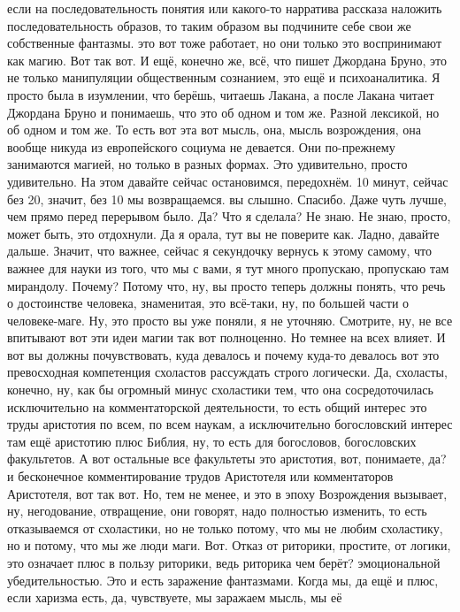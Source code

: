 если на последовательность понятия или какого-то нарратива рассказа наложить
последовательность образов, то таким образом вы подчините себе свои же
собственные фантазмы. это вот тоже работает, но они только это воспринимают как
магию. Вот так вот. И ещё, конечно же, всё, что пишет Джордана Бруно, это не
только манипуляции общественным сознанием, это ещё и психоаналитика. Я просто
была в изумлении, что берёшь, читаешь Лакана, а после Лакана читает Джордана
Бруно и понимаешь, что это об одном и том же. Разной лексикой, но об одном и том
же. То есть вот эта вот мысль, она, мысль возрождения, она вообще никуда из
европейского социума не девается. Они по-прежнему занимаются магией, но только в
разных формах. Это удивительно, просто удивительно. На этом давайте сейчас
остановимся, передохнём. 10 минут, сейчас без 20, значит, без 10 мы
возвращаемся. вы слышно. Спасибо. Даже чуть лучше, чем прямо перед перерывом
было. Да? Что я сделала? Не знаю. Не знаю, просто, может быть, это отдохнули. Да
я орала, тут вы не поверите как. Ладно, давайте дальше. Значит, что важнее,
сейчас я секундочку вернусь к этому самому, что важнее для науки из того, что мы
с вами, я тут много пропускаю, пропускаю там мирандолу. Почему? Потому что, ну,
вы просто теперь должны понять, что речь о достоинстве человека, знаменитая, это
всё-таки, ну, по большей части о человеке-маге. Ну, это просто вы уже поняли, я
не уточняю. Смотрите, ну, не все впитывают вот эти идеи магии так вот
полноценно. Но темнее на всех влияет. И вот вы должны почувствовать, куда
девалось и почему куда-то девалось вот это превосходная компетенция схоластов
рассуждать строго логически. Да, схоласты, конечно, ну, как бы огромный минус
схоластики тем, что она сосредоточилась исключительно на комментаторской
деятельности, то есть общий интерес это труды аристотия по всем, по всем наукам,
а исключительно богословский интерес там ещё аристотию плюс Библия, ну, то есть
для богословов, богословских факультетов. А вот остальные все факультеты это
аристотия, вот, понимаете, да? и бесконечное комментирование трудов Аристотеля
или комментаторов Аристотеля, вот так вот. Но, тем не менее, и это в эпоху
Возрождения вызывает, ну, негодование, отвращение, они говорят, надо полностью
изменить, то есть отказываемся от схоластики, но не только потому, что мы не
любим схоластику, но и потому, что мы же люди маги. Вот. Отказ от риторики,
простите, от логики, это означает плюс в пользу риторики, ведь риторика чем
берёт? эмоциональной убедительностью. Это и есть заражение фантазмами. Когда мы,
да ещё и плюс, если харизма есть, да, чувствуете, мы заражаем мысль, мы её
